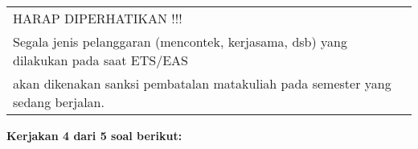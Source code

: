 \documentclass[11pt,letterpaper]{article}
\begin{document}
\begin{table}[h!]
\begin{tabular}{r c}
    \\ \hline
    \multicolumn{2}{|l|}{\MakeUppercase{harap diperhatikan !!!}}                                                                                                                      \\
    \multicolumn{2}{|l|}{Segala jenis pelanggaran (mencontek, kerjasama, dsb) yang dilakukan pada saat ETS/EAS}                                                                       \\
    \multicolumn{2}{|l|}{akan dikenakan sanksi pembatalan matakuliah pada semester yang sedang berjalan.}                                                                             \\
    \hline
  \end{tabular}
\end{table}
\vspace*{-0.3cm}
\begin{center}
  \large\textbf{Kerjakan 4 dari 5 soal berikut:}
\end{center}
\end{document}
